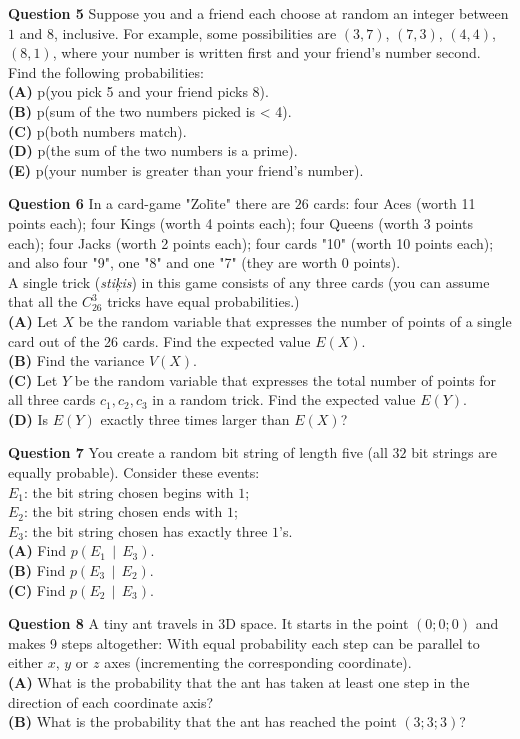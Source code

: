 \documentclass[jou]{apa6}
\begin{document}
\vspace{10pt}
{\bf Question 5} Suppose you and a friend each choose at random an integer between $1$ and $8$, inclusive. For example, some
possibilities are $(3,7)$, $(7,3)$, $(4,4)$, $(8,1)$, where your number is written first and your friend’s number second.
Find the following probabilities:\\
{\bf (A)} p(you pick 5 and your friend picks 8).\\
{\bf (B)} p(sum of the two numbers picked is < 4).\\
{\bf (C)} p(both numbers match).\\
{\bf (D)} p(the sum of the two numbers is a prime).\\
{\bf (E)} p(your number is greater than your friend’s number).

\vspace{10pt}
{\bf Question 6} In a card-game "Zol\={\i}te" there are $26$ cards: four Aces (worth 11 points each); 
four Kings (worth 4 points each); four Queens (worth 3 points each); four Jacks (worth 2 points each); 
four cards "10" (worth 10 points each); and also four "9", one "8" and one "7" (they are worth 0 points).\\
A single trick ({\em sti\c{k}is}) in this game consists of any three cards (you can assume that all the 
$C_{26}^3$ tricks have equal probabilities.)\\
{\bf (A)} Let $X$ be the random variable that expresses the number of points of a single card out 
of the 26 cards.  Find the expected value $E(X)$.\\
{\bf (B)} Find the variance $V(X)$.\\
{\bf (C)} Let $Y$ be the random variable that expresses the total number of points for all three
cards $c_1,c_2,c_3$ in a random trick. Find the expected value $E(Y)$.\\
{\bf (D)} Is $E(Y)$ exactly three times larger than $E(X)$?

\vspace{10pt}
{\bf Question 7} You create a random bit string of length five (all $32$ bit strings are equally probable). Consider
these events:\\
$E_1$: the bit string chosen begins with $1$;\\
$E_2$: the bit string chosen ends with $1$;\\
$E_3$: the bit string chosen has exactly three $1$’s.\\
{\bf (A)} Find $p(E_1 \,\mid\, E_3)$.\\
{\bf (B)} Find $p(E_3 \,\mid\, E_2)$.\\
{\bf (C)} Find $p(E_2 \,\mid\, E_3)$.


\vspace{10pt}
{\bf Question 8} A tiny ant travels in 3D space. It starts in the point $(0;0;0)$ and 
makes 9 steps altogether: With equal probability 
each step can be parallel to either $x$, $y$ or $z$ axes (incrementing the corresponding coordinate).\\ 
{\bf (A)} What is the probability that the 
ant has taken at least one step in the direction of each coordinate axis?\\
{\bf (B)} What is the probability that the ant has reached the point $(3;3;3)$?
\end{document}
